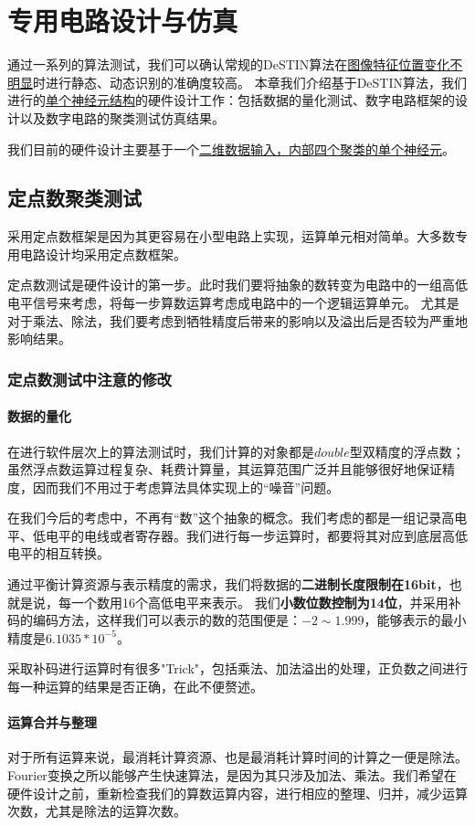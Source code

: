 \chapter{专用电路设计与仿真}\label{chapter_design}
\graphicspath{{chapter4/figure/}}

通过一系列的算法测试，我们可以确认常规的DeSTIN算法在\uline{图像特征位置变化不明显}时进行静态、动态识别的准确度较高。 本章我们介绍基于DeSTIN算法，我们进行的\uline{单个神经元结构}的硬件设计工作：包括数据的量化测试、数字电路框架的设计以及数字电路的聚类测试仿真结果。

我们目前的硬件设计主要基于一个\uline{二维数据输入，内部四个聚类的单个神经元}。 

\section{定点数聚类测试}
采用定点数框架是因为其更容易在小型电路上实现，运算单元相对简单。大多数专用电路设计均采用定点数框架。

定点数测试是硬件设计的第一步。此时我们要将抽象的数转变为电路中的一组高低电平信号来考虑，将每一步算数运算考虑成电路中的一个逻辑运算单元。 尤其是对于乘法、除法，我们要考虑到牺牲精度后带来的影响以及溢出后是否较为严重地影响结果。

\subsection{定点数测试中注意的修改}
\subsubsection{数据的量化} 
在进行软件层次上的算法测试时，我们计算的对象都是$double$型双精度的浮点数；虽然浮点数运算过程复杂、耗费计算量，其运算范围广泛并且能够很好地保证精度，因而我们不用过于考虑算法具体实现上的“噪音”问题。

在我们今后的考虑中，不再有“数”这个抽象的概念。我们考虑的都是一组记录高电平、低电平的电线或者寄存器。我们进行每一步运算时，都要将其对应到底层高低电平的相互转换。

通过平衡计算资源与表示精度的需求，我们将数据的\textbf{二进制长度限制在16bit}，也就是说，每一个数用16个高低电平来表示。 我们\textbf{小数位数控制为14位}，并采用补码的编码方法，这样我们可以表示的数的范围便是：$-2\sim 1.999$，能够表示的最小精度是$6.1035*10^{-5}$。

采取补码进行运算时有很多"Trick"，包括乘法、加法溢出的处理，正负数之间进行每一种运算的结果是否正确，在此不便赘述。

\subsubsection{运算合并与整理}
对于所有运算来说，最消耗计算资源、也是最消耗计算时间的计算之一便是除法。Fourier变换之所以能够产生快速算法，是因为其只涉及加法、乘法。我们希望在硬件设计之前，重新检查我们的算数运算内容，进行相应的整理、归并，减少运算次数，尤其是除法的运算次数。

